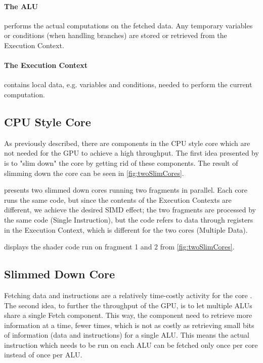 \paragraph{The \gls{ALU}} performs the actual computations on the fetched data. Any temporary variables or conditions (when handling branches) are stored or retrieved from the Execution Context.

\paragraph{The Execution Context} contains local data, e.g. variables and conditions, needed to perform the current computation.

\subsection{\acs{CPU} Style Core}
As previously described, there are components in the \gls{CPU} style core which are not needed for the \gls{GPU} to achieve a high throughput.
The first idea presented by \citet{intro_to_gpu_arch} is to "slim down" the core by getting rid of these components.
The result of slimming down the core can be seen in \cref{fig:twoSlimCores}.



 presents two slimmed down cores running two fragments in parallel. 
Each core runs the same code, but since the contents of the Execution Contexts are different, we achieve the desired \gls{SIMD} effect; the two fragments are processed by the same code (Single Instruction), but the code refers to data through registers in the Execution Context, which is different for the two cores (Multiple Data).

 displays the shader code run on fragment 1 and 2 from \cref{fig:twoSlimCores}.

\subsection{Slimmed Down Core}
Fetching data and instructions are a relatively time-costly activity for the core .
The second idea, to further the throughput of the \gls{GPU}, is to let multiple \glspl{ALU} share a single Fetch component.
This way, the component need to retrieve more information at a time, fewer times, which is not as costly as retrieving small bits of information (data and instructions) for a single \gls{ALU}.
This means the actual instruction which needs to be run on each \gls{ALU} can be fetched only once per core instead of once per \gls{ALU}.

